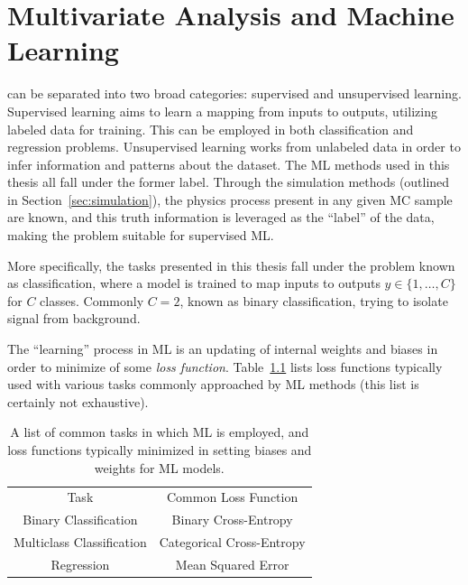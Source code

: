 
\chapter{Multivariate Analysis and Machine Learning}
\label{app:MVA}

 can be separated into two broad categories: supervised and unsupervised learning. Supervised learning aims to learn a mapping from inputs to outputs, utilizing labeled data for training. This can be employed in both classification and regression problems. Unsupervised learning works from unlabeled data in order to infer information and patterns about the dataset. The \gls{ML} methods used in this thesis all fall under the former label. Through the simulation methods (outlined in Section~\ref{sec:simulation}), the physics process present in any given \gls{MC} sample are known, and this truth information is leveraged as the ``label'' of the data, making the problem suitable for supervised \gls{ML}.

More specifically, the tasks presented in this thesis fall under the problem known as classification, where a model is trained to map inputs to outputs $y \in \{1,\ldots,C\}$ for $C$ classes. Commonly $C=2$, known as binary classification, trying to isolate signal from background.

The ``learning'' process in \gls{ML} is an updating of internal weights and biases in order to minimize of some \textit{loss function}. Table~\ref{tab:loss-functions} lists loss functions typically used with various tasks commonly approached by \gls{ML} methods (this list is certainly not exhaustive).

\begin{table}[!ht]
    \centering
    \caption[A list of common tasks in which \gls{ML} is employed, and loss functions typically used.]{A list of common tasks in which \gls{ML} is employed, and loss functions typically minimized in setting biases and weights for \gls{ML} models.}
    \begin{tabular}{c|c}
        Task                  & Common Loss Function \\
        \cline{1-2}
        Binary Classification     & Binary Cross-Entropy\\
        Multiclass Classification & Categorical Cross-Entropy\\
        Regression                & Mean Squared Error
    \end{tabular}  
    \label{tab:loss-functions}
\end{table}

